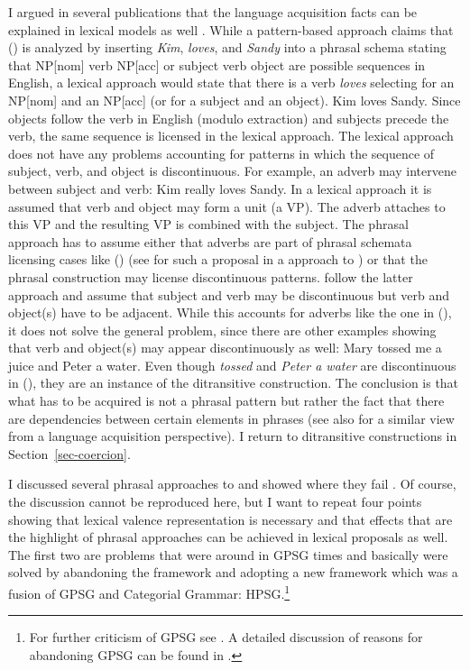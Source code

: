 \documentclass[output=paper
	        ,collection
	        ,collectionchapter
 	        ,biblatex
                ,babelshorthands
                ,newtxmath
                ,draftmode
                ,colorlinks, citecolor=brown
]{langscibook}
\begin{document}
I argued in several publications that the language acquisition facts can be explained in lexical
models as well \parencites[Section~6.3]{MuellerPersian}[Section~9]{MWArgSt}. While a pattern-based approach claims that () is
analyzed by inserting \emph{Kim}, \emph{loves}, and \emph{Sandy} into a phrasal schema stating that
NP[nom] verb NP[acc] or subject verb object are possible sequences in English, a lexical approach
would state that there is a verb \emph{loves} selecting for an NP[nom] and an NP[acc] (or for a
subject and an object).
\ea
Kim loves Sandy.
\z
Since objects follow the verb in English (modulo extraction) and subjects precede the verb, the same
sequence is licensed in the lexical approach. The lexical approach does not have any problems
accounting for patterns in which the sequence of subject, verb, and object is discontinuous. For
example, an adverb may intervene between subject and verb:
\ea
Kim really loves Sandy.
\z
In a lexical approach it is assumed that verb and object may form a unit (a VP). The adverb attaches
to this VP and the resulting VP is combined with the subject. The phrasal approach has to assume
either that adverbs are part of phrasal schemata licensing cases like () (see
\citealt[Section~6.3.2]{Uszkoreit87a} for such a proposal in a \gpsg approach to ) or that the phrasal
construction may license discontinuous patterns. \citet[]{BC2005a} follow the latter approach and
assume that subject and verb may be discontinuous but verb and object(s) have to be adjacent. While
this accounts for adverbs like the one in (), it does not solve the general problem, since
there are other examples showing that verb and object(s) may appear discontinuously as well:
\ea
Mary tossed me a juice and Peter a water.
\z
Even though \emph{tossed} and \emph{Peter a water} are discontinuous in (), they are an
instance of the ditransitive construction. The conclusion is that what has to be acquired is not a phrasal pattern but rather the fact that
there are dependencies between certain elements in phrases (see also
\citealt{Behrens2009a} for a similar view from a language acquisition perspective). I return to ditransitive
constructions in Section~\ref{sec-coercion}.%

I discussed several phrasal approaches to  and showed where they fail
\citep{Mueller2006d,Mueller2006c,Mueller2007d,MuellerPersian,MWArgSt,MWArgStReply,MuellerLFGphrasal}. Of course,
the discussion cannot be reproduced here, but I want to repeat four points showing that lexical valence
representation is necessary and that effects that are the highlight of phrasal approaches can be
achieved in lexical proposals as well. The first two are problems that were around in GPSG times and basically
were solved by abandoning the framework and adopting a new framework which was a fusion of GPSG and
Categorial Grammar: HPSG.\footnote{
  For further criticism of GPSG see \citet{Jacobson87b}. A detailed discussion of reasons for
  abandoning GPSG can be found in \citet[Section~5.5]{MuellerGT-Eng1}.
}
\end{document}

